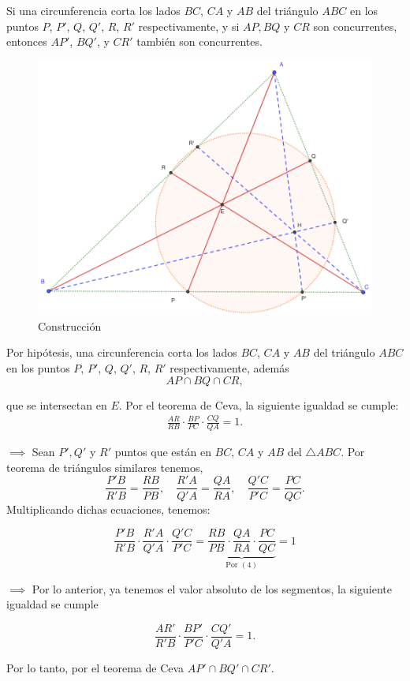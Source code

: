 \begin{problema}
	Si una circunferencia corta los lados $BC$, $CA$ y $AB$ del triángulo $ABC$ en los puntos $P$, $P'$, $Q$, $Q'$, $R$, $R'$ respectivamente, y si $AP, BQ$ y $CR$ son concurrentes, entonces $AP'$, $BQ'$, y $CR'$ también son concurrentes.
		\begin{figure}[H]
		\centering
		\includegraphics[scale=0.3]{Images/4}
		\caption{Construcción}
	\end{figure}
	
\end{problema}


\begin{dem}
	Por hipótesis, una circunferencia corta los lados $BC$, $CA$ y $AB$ del triángulo $ABC$ en los puntos $P$, $P'$, $Q$, $Q'$, $R$, $R'$ respectivamente, además 
	$$AP\cap BQ \cap CR,$$
	
	que se intersectan en $E$. Por el teorema de Ceva, la siguiente igualdad se cumple: 
	\begin{gather}
		\frac{AR}{RB}\cdot\frac{BP}{PC}\cdot\frac{CQ}{QA} =1.
	\end{gather}
	


	$\implies$ 	Sean $P',Q'$ y $R'$ puntos que están en $BC$, $CA$ y $AB$ del $\triangle ABC$. 	Por teorema de triángulos similares tenemos, 
	$$\frac{P'B}{R'B}=\frac{RB}{PB}, \quad \frac{R'A}{Q'A}=  \frac{QA}{RA}, \quad  \frac{Q'C}{P'C}= \frac{PC}{QC}.$$
	Multiplicando dichas ecuaciones, tenemos: 

	$$\frac{P'B}{R'B}\cdot \frac{R'A}{Q'A}\cdot \frac{Q'C}{P'C}=\underbrace{\frac{RB}{PB}\cdot \frac{QA}{RA}\cdot \frac{PC}{QC}}_{\text{Por }  (4)}=1$$
	
	
	$\implies$  Por lo anterior, ya tenemos el valor absoluto de los segmentos, la siguiente igualdad se cumple
	
	$$\frac{AR'}{R'B}\cdot\frac{BP'}{P'C}\cdot\frac{CQ'}{Q'A} =1. $$
	
	Por lo tanto, por el teorema de Ceva $AP'\cap BQ' \cap CR'$. 
\end{dem}






